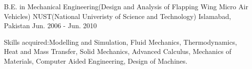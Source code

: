 \begin{cventries}
	
	\cventry
	{B.E. in Mechanical Engineering(Design and Analysis of Flapping Wing Micro Air Vehicles)} %
	{NUST(National Univeristy of Science and Technology)} %
	{Islamabad, Pakistan} %
	{Jun. 2006 - Jun. 2010} %
	{
		\begin{cvitems} %
			\item {Skills acquired:Modelling and Simulation, Fluid Mechanics, Thermodynamics, Heat and Mass Transfer, Solid Mechanics, Advanced Calculus, Mechanics of Materials, Computer Aided Engineering, Design of Machines.}
		\end{cvitems}
	}
	
\end{cventries}
